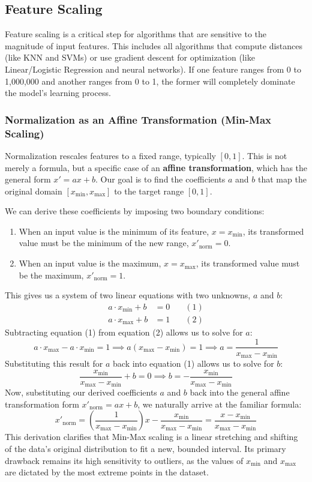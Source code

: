 \subsection{Feature Scaling}
\label{subsec:feature_scaling}
Feature scaling is a critical step for algorithms that are sensitive to the magnitude of input features. This includes all algorithms that compute distances (like KNN and SVMs) or use gradient descent for optimization (like Linear/Logistic Regression and neural networks). If one feature ranges from 0 to 1,000,000 and another ranges from 0 to 1, the former will completely dominate the model's learning process.

\subsubsection{Normalization as an Affine Transformation (Min-Max Scaling)}
Normalization rescales features to a fixed range, typically $[0, 1]$. This is not merely a formula, but a specific case of an \textbf{affine transformation}, which has the general form $x' = ax + b$. Our goal is to find the coefficients $a$ and $b$ that map the original domain $[x_{\min}, x_{\max}]$ to the target range $[0, 1]$.

We can derive these coefficients by imposing two boundary conditions:
\begin{enumerate}
    \item When an input value is the minimum of its feature, $x = x_{\min}$, its transformed value must be the minimum of the new range, $x'_{\text{norm}} = 0$.
    \item When an input value is the maximum, $x = x_{\max}$, its transformed value must be the maximum, $x'_{\text{norm}} = 1$.
\end{enumerate}
This gives us a system of two linear equations with two unknowns, $a$ and $b$:
\begin{align*}
    a \cdot x_{\min} + b &= 0 \quad &(1) \\
    a \cdot x_{\max} + b &= 1 \quad &(2)
\end{align*}
Subtracting equation (1) from equation (2) allows us to solve for $a$:
$$ a \cdot x_{\max} - a \cdot x_{\min} = 1 \implies a(x_{\max} - x_{\min}) = 1 \implies a = \frac{1}{x_{\max} - x_{\min}} $$
Substituting this result for $a$ back into equation (1) allows us to solve for $b$:
$$ \frac{x_{\min}}{x_{\max} - x_{\min}} + b = 0 \implies b = - \frac{x_{\min}}{x_{\max} - x_{\min}} $$
Now, substituting our derived coefficients $a$ and $b$ back into the general affine transformation form $x'_{\text{norm}} = ax + b$, we naturally arrive at the familiar formula:
$$ x'_{\text{norm}} = \left(\frac{1}{x_{\max} - x_{\min}}\right)x - \frac{x_{\min}}{x_{\max} - x_{\min}} = \frac{x - x_{\min}}{x_{\max} - x_{\min}} $$
This derivation clarifies that Min-Max scaling is a linear stretching and shifting of the data's original distribution to fit a new, bounded interval. Its primary drawback remains its high sensitivity to outliers, as the values of $x_{\min}$ and $x_{\max}$ are dictated by the most extreme points in the dataset.

